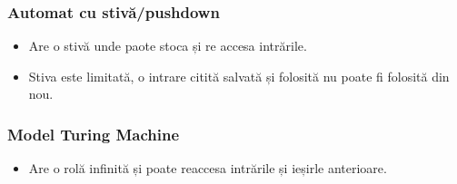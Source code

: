 \begin{frame}
    \frametitle{Automat cu stivă/pushdown}
    \newsavebox{\asciistackfsm}
    \begin{lrbox}{\asciistackfsm}
        \begin{varwidth}{\maxdimen}
        \end{varwidth}
    \end{lrbox}%

    \begin{figure}[h]
        \centering
        \scalebox{0.8}{\usebox{\asciistackfsm}}
    \end{figure}
    \begin{itemize}
        \item Are o stivă unde paote stoca și re accesa intrările.
        \item Stiva este limitată, o intrare citită salvată și folosită nu poate fi folosită din nou.
    \end{itemize}
\end{frame}


\begin{frame}
    \frametitle{Model Turing Machine}
    \newsavebox{\asciituring}
    \begin{lrbox}{\asciituring}
        \begin{varwidth}{\maxdimen}
        \end{varwidth}
    \end{lrbox}%

    \begin{figure}[h]
        \centering
        \scalebox{0.8}{\usebox{\asciituring}}
    \end{figure}
    \begin{itemize}
        \item Are o rolă infinită și poate reaccesa intrările și ieșirle anterioare.
    \end{itemize}
\end{frame}
